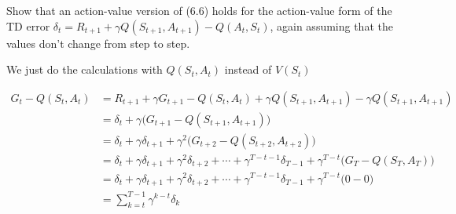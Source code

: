 
\begin{exercise}

Show that an action-value version of (6.6) holds for the action-value form of the TD error $\delta_t = R_{t+1} + \gamma Q(S_{t+1},A_{t+1}) - Q(A_t,S_t)$, again assuming that the values don't change from step to step.
\end{exercise}


\begin{solution}

We just do the calculations with $Q(S_t,A_t)$ instead of $V(S_t)$

\begin{align*}
  G_t - Q(S_t, A_t)
  &=
  R_{t+1} + \gamma G_{t+1} - Q(S_t, A_t) + \gamma Q(S_{t+1},A_{t+1}) - \gamma Q(S_{t+1},A_{t+1})\\
  &=
  \delta_t + \gamma\big(G_{t+1} - Q(S_{t+1},A_{t+1})\big) \\
  &=
  \delta_t + \gamma \delta_{t+1} + \gamma^2\big(G_{t+2} - Q(S_{t+2},A_{t+2})\big) \\
  &=
  \delta_t + \gamma \delta_{t+1} + \gamma^2 \delta_{t+2} + \cdots +
  \gamma^{T-t-1}\delta_{T-1} + \gamma^{T-t}\big(G_T - Q(S_T,A_T)\big) \\
  &=
  \delta_t + \gamma \delta_{t+1} + \gamma^2 \delta_{t+2} + \cdots +
  \gamma^{T-t-1}\delta_{T-1} + \gamma^{T-t}\big(0-0\big) \\
  &=
  \sum_{k=t}^{T-1}\gamma^{k-t}\delta_k
\end{align*}

\end{solution}


